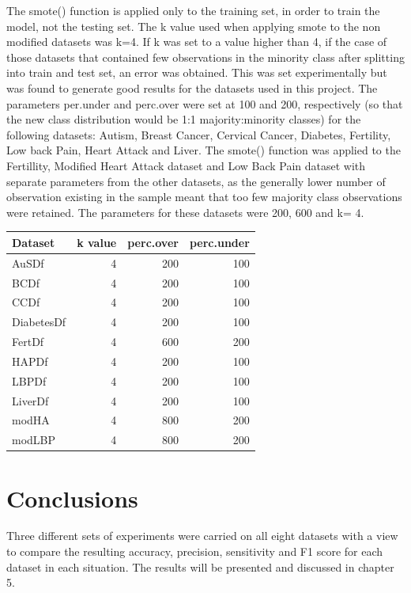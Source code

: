 The smote() function is applied only to the training set, in order to train the model,  not the testing set.\newline
The k value used when applying smote to the non modified datasets was k=4. If k was set to a value higher than 4, if the case of those datasets that contained few observations in the minority class after splitting into train and test set, an error was obtained. This was set experimentally but was found to generate good results for the datasets used in this project.\newline
The parameters per.under and perc.over were set at 100 and 200, respectively (so that the new class distribution would be 1:1 majority:minority classes) for the following datasets: Autism, Breast Cancer, Cervical Cancer, Diabetes, Fertility, Low back Pain, Heart Attack and Liver.
The smote() function was applied to the Fertillity, Modified Heart Attack dataset and Low Back Pain dataset with separate parameters from the other datasets, as the generally lower number of observation existing in the sample meant that too few majority class observations were retained. The parameters for these datasets were 200, 600 and k= 4.

\begin{table}[ht]
\centering
\begin{tabular}{lrrr}
  \hline
  \rowcolor{LightCyan}
Dataset & k value & perc.over & perc.under \\ 
  \hline
  AuSDf & 4 & 200 & 100  \\ 
  BCDf & 4 &  200 & 100 \\ 
  CCDf & 4 &  200 & 100\\ 
  DiabetesDf & 4 & 200 & 100 \\ 
  FertDf & 4 &  600 & 200 \\ 
  HAPDf & 4&  200 & 100 \\ 
  LBPDf & 4 &  200 & 100 \\ 
  LiverDf & 4 &  200 & 100 \\
  modHA & 4 & 800 & 200 \\
  modLBP & 4 & 800 & 200 \\
   \hline
\end{tabular}
\label{tab:smoteParam}
\end{table}




\section{Conclusions}
Three different sets of experiments were carried on all eight datasets with a view to compare the resulting accuracy, precision, sensitivity and F1 score for each dataset in each situation. The results will be presented and discussed in chapter 5.



